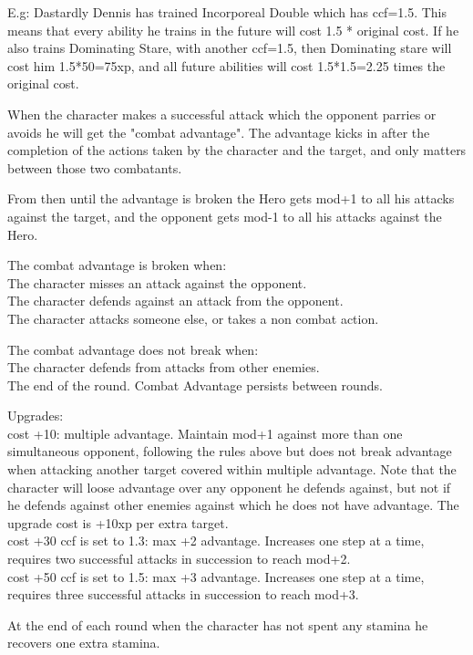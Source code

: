 E.g: Dastardly Dennis has trained Incorporeal Double which has ccf=1.5. This means that every ability he trains in the future will cost 1.5 * original cost. If he also trains Dominating Stare, with another ccf=1.5, then Dominating stare will cost him 1.5*50=75xp, and all future abilities will cost 1.5*1.5=2.25 times the original cost.


\openskillslist


 When the character makes a successful attack which the opponent parries or avoids he will get the "combat advantage". The advantage kicks in after the completion of the actions taken by the character and the target, and only matters between those two combatants.

From then until the advantage is broken the Hero gets mod+1 to all his attacks against the target, and the opponent gets mod-1 to all his attacks against the Hero.

The combat advantage is broken when: \\
The character misses an attack against the opponent. \\
The character defends against an attack from the opponent. \\
The character attacks someone else, or takes a non combat action.

The combat advantage does not break when: \\
The character defends from attacks from other enemies. \\
The end of the round. Combat Advantage persists between rounds.

Upgrades: \\
cost +10: multiple advantage. Maintain mod+1 against more than one simultaneous opponent, following the rules above but does not break advantage when attacking another target covered within multiple advantage. Note that the character will loose advantage over any opponent he defends against, but not if he defends against other enemies against which he does not have advantage. The upgrade cost is +10xp per extra target. \\
cost +30 ccf is set to 1.3: max +2 advantage. Increases one step at a time, requires two successful attacks in succession to reach mod+2. \\
cost +50 ccf is set to 1.5: max +3 advantage. Increases one step at a time, requires three successful attacks in succession to reach mod+3.


 At the end of each round when the character has not spent any stamina he recovers one extra stamina.


